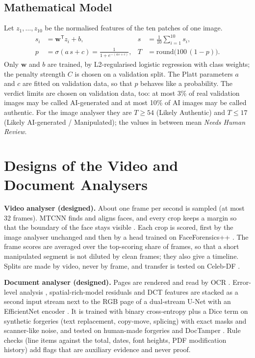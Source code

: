 \subsection{Mathematical Model}
Let $z_1,\dots,z_{10}$ be the normalised features of the ten patches of one image.
\begin{align}
  s_i &= \mathbf{w}^{\mathsf T} z_i + b, & s &= \frac{1}{10}\sum_{i=1}^{10} s_i, \\
  p &= \sigma(a\,s + c) = \frac{1}{1+e^{-(a s + c)}}, & T &= \mathrm{round}\bigl(100\,(1-p)\bigr).
\end{align}
Only $\mathbf{w}$ and $b$ are trained, by L2-regularised logistic regression with class weights; the penalty strength $C$ is chosen on a validation split. The Platt parameters $a$ and $c$ are fitted on validation data, so that $p$ behaves like a probability. The verdict limits are chosen on validation data, too: at most 3\% of real validation images may be called AI-generated and at most 10\% of AI images may be called authentic. For the image analyser they are $T\ge 54$ (Likely Authentic) and $T\le 17$ (Likely AI-generated / Manipulated); the values in between mean \emph{Needs Human Review}.

\section{Designs of the Video and Document Analysers}
\textbf{Video analyser (designed).} About one frame per second is sampled (at most 32 frames). MTCNN \cite{mtcnn} finds and aligns faces, and every crop keeps a margin so that the boundary of the face stays visible \cite{li}. Each crop is scored, first by the image analyser unchanged and then by a head trained on FaceForensics++ \cite{rossler}. The frame scores are averaged over the top-scoring share of frames, so that a short manipulated segment is not diluted by clean frames; they also give a timeline. Splits are made by video, never by frame, and transfer is tested on Celeb-DF \cite{celebdf}.

\textbf{Document analyser (designed).} Pages are rendered and read by OCR \cite{tesseract}. Error-level analysis \cite{krawetz}, spatial-rich-model residuals \cite{fridrich} and DCT features are stacked as a second input stream next to the RGB page of a dual-stream U-Net \cite{unet,zhou} with an EfficientNet encoder \cite{effnet}. It is trained with binary cross-entropy plus a Dice term \cite{vnet} on synthetic forgeries (text replacement, copy-move, splicing) with exact masks and scanner-like noise, and tested on human-made forgeries and DocTamper \cite{doctamper}. Rule checks (line items against the total, dates, font heights, PDF modification history) add flags that are auxiliary evidence and never proof.

